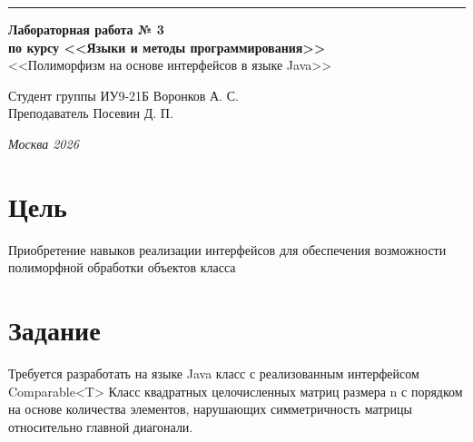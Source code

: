 \documentclass[a4paper, 14pt]{extarticle}
\begin{document}
\begin{titlepage}
\vspace*{-16pt}
\hspace{30pt}\rule{0.866\textwidth}{0.4pt}
  
\vspace{11em}

\begin{center}
\Large {\bf Лабораторная работа № 3} \\ 
\large {\bf по курсу <<Языки и методы программирования>>} \\ 
\large <<Полиморфизм на основе интерфейсов в языке Java>>
\end{center}\normalsize

\vspace{8em}


\begin{flushright}
  {Студент группы ИУ9-21Б Воронков А. С.\hspace*{15pt} \\
  \vspace{2ex}
  Преподаватель Посевин Д. П.\hspace*{15pt}}
\end{flushright}

\bigskip

\vfill
 

\begin{center}
\textsl{Москва 2026}
\end{center}
\end{titlepage}

\renewcommand{\ttdefault}{pcr}

\setlength{\tabcolsep}{3pt}
\newpage
\setcounter{page}{2}

\section{Цель}\label{Sect::task}
\par 
Приобретение навыков реализации интерфейсов для обеспечения возможности 
полиморфной обработки объектов класса 
\section{Задание}
Требуется разработать на языке Java класс с реализованным интерфейсом Comparable<T>
Класс квадратных целочисленных матриц размера n с порядком на основе 
количества элементов, нарушающих симметричность матрицы относительно 
главной диагонали. 
\pagebreak
\end{document}
